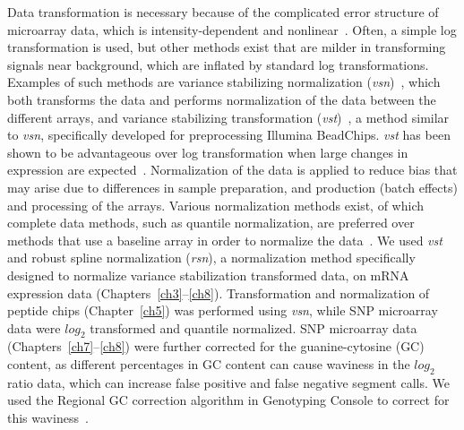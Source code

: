 Data transformation is necessary because of the complicated error structure of microarray data, which is intensity\hyp{}dependent and nonlinear~\cite{durbin2002variance}. Often, a simple log transformation is used, but other methods exist that are milder in transforming signals near background, which are inflated by standard log transformations. Examples of such methods are variance stabilizing normalization ({\it vsn})~\cite{huber2002variance}, which both transforms the data and performs normalization of the data between the different arrays, and variance stabilizing transformation ({\it vst})~\cite{lin2008model}, a method similar to {\it vsn}, specifically developed for preprocessing Illumina BeadChips. {\it vst} has been shown to be advantageous over log transformation when large changes in expression are expected~\cite{dunning2008spike,du2010evaluation}. Normalization of the data is applied to reduce bias that may arise due to differences in sample preparation, and production (batch effects) and processing of the arrays. Various normalization methods exist, of which complete data methods, such as quantile normalization, are preferred over methods that use a baseline array in order to normalize the data~\cite{bolstad2003comparison}. We used {\it vst} and robust spline normalization ({\it rsn}), a normalization method specifically designed to normalize variance stabilization transformed data, on mRNA expression data (Chapters~\ref{ch3}--\ref{ch8}). Transformation and normalization of peptide chips (Chapter~\ref{ch5}) was performed using {\it vsn}, while SNP microarray data were $log_2$ transformed and quantile normalized. SNP microarray data (Chapters~\ref{ch7}--\ref{ch8}) were further corrected for the guanine\hyp{}cytosine (GC) content, as different percentages in GC content can cause waviness in the $log_2$ ratio data, which can increase false positive and false negative segment calls. We used the Regional GC correction algorithm in Genotyping Console to correct for this waviness~\cite{gcwaviness}.

